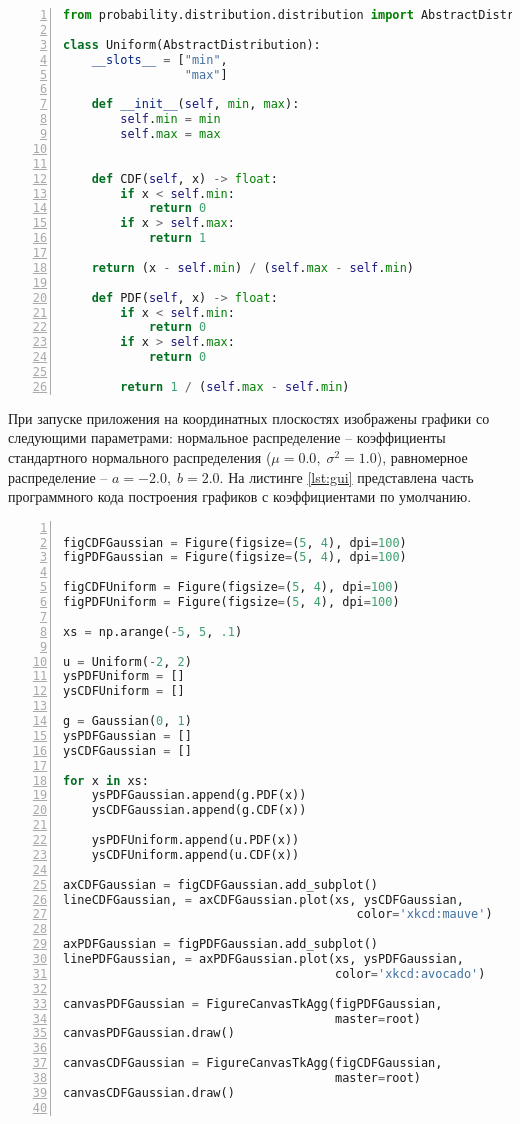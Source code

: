 \begin{lstlisting}[language=Python,
	frame= tb,
	numbers=left,
	numberstyle=\footnotesize,
	caption={Класс Uniform},
	label={lst:uniform}]
from probability.distribution.distribution import AbstractDistribution
	
class Uniform(AbstractDistribution):
	__slots__ = ["min",
				 "max"]

	def __init__(self, min, max):
		self.min = min
		self.max = max


	def CDF(self, x) -> float:
		if x < self.min:
			return 0
		if x > self.max:
			return 1

	return (x - self.min) / (self.max - self.min)

	def PDF(self, x) -> float:
		if x < self.min:
			return 0
		if x > self.max:
			return 0

		return 1 / (self.max - self.min)
\end{lstlisting}

При запуске приложения на координатных плоскостях изображены графики со следующими параметрами: нормальное распределение -- коэффициенты стандартного нормального распределения ($\mu = 0.0, \; \sigma^2 = 1.0$), равномерное распределение -- $a=-2.0,\; b=2.0$. На листинге \ref{lst:gui} представлена часть программного кода построения графиков с коэффициентами по умолчанию. 

\begin{lstlisting}[language=Python,
	frame= tb,
	numbers=left,
	numberstyle=\footnotesize,
	caption={Часть программного кода построения графиков},
	label={lst:gui}]

figCDFGaussian = Figure(figsize=(5, 4), dpi=100)
figPDFGaussian = Figure(figsize=(5, 4), dpi=100)

figCDFUniform = Figure(figsize=(5, 4), dpi=100)
figPDFUniform = Figure(figsize=(5, 4), dpi=100)

xs = np.arange(-5, 5, .1)

u = Uniform(-2, 2)
ysPDFUniform = []
ysCDFUniform = []

g = Gaussian(0, 1)
ysPDFGaussian = []
ysCDFGaussian = []

for x in xs:
	ysPDFGaussian.append(g.PDF(x))
	ysCDFGaussian.append(g.CDF(x))

	ysPDFUniform.append(u.PDF(x))
	ysCDFUniform.append(u.CDF(x))

axCDFGaussian = figCDFGaussian.add_subplot()
lineCDFGaussian, = axCDFGaussian.plot(xs, ysCDFGaussian,
										 color='xkcd:mauve')

axPDFGaussian = figPDFGaussian.add_subplot()
linePDFGaussian, = axPDFGaussian.plot(xs, ysPDFGaussian,
									  color='xkcd:avocado')

canvasPDFGaussian = FigureCanvasTkAgg(figPDFGaussian,
									  master=root)
canvasPDFGaussian.draw()

canvasCDFGaussian = FigureCanvasTkAgg(figCDFGaussian,
									  master=root)
canvasCDFGaussian.draw()
	
\end{lstlisting}